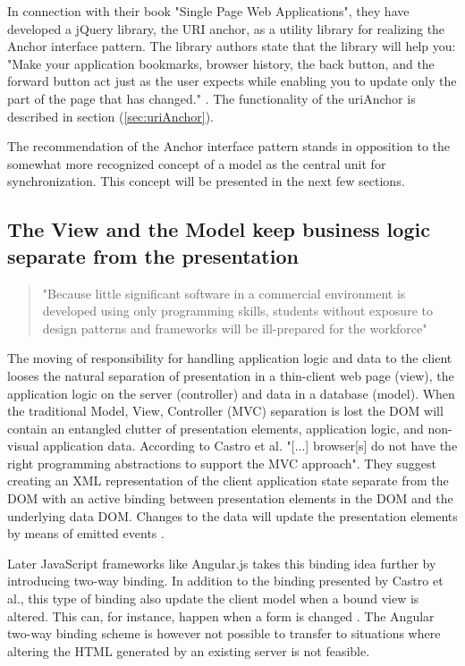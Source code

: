 \documentclass[english]{ifimaster}
\begin{document}
In connection with their book "Single Page Web Applications", they have developed a jQuery library, the URI anchor, as a utility library for realizing the Anchor interface pattern. The library authors state that the library will help you: "Make your application bookmarks, browser history, the back button, and the forward button act just as the user expects while enabling you to update only the part of the page that has changed." \parencite{urianchor}. The functionality of the uriAnchor is described in section (\ref{sec:uriAnchor}). 

The recommendation of the Anchor interface pattern stands in opposition to the somewhat more recognized concept of a model as the central unit for synchronization. This concept will be presented in the next few sections.


\subsection{The View and the Model keep business logic separate from the presentation} 
\begin{quotation}
"Because little significant software in a commercial environment
is developed using only programming skills, students without exposure to design patterns and
frameworks will be ill-prepared for the workforce" \parencite{chao}
\end{quotation}
The moving of responsibility for handling application logic and data to the client looses the natural separation of presentation in a thin-client web page (view), the application logic on the server (controller) and data in a database (model). When the traditional Model, View, Controller (MVC) separation is lost the DOM will contain an entangled clutter of presentation elements, application logic, and non-visual application data. According to Castro et al. "[...] browser[s] do not have the right programming abstractions to support the MVC approach". They suggest creating an XML representation of the client application state separate from the DOM with an active binding between presentation elements in the DOM and the underlying data DOM. Changes to the data will update the presentation elements by means of emitted events \parencite{castro}.

Later JavaScript frameworks like Angular.js takes this binding idea further by introducing two-way binding. In addition to the binding presented by Castro et al., this type of binding also update the client model when a bound view is altered. This can, for instance, happen when a form is changed \parencite{angular}. The Angular two-way binding scheme is however not possible to transfer to situations where altering the HTML generated by an existing server is not feasible.
\end{document}
